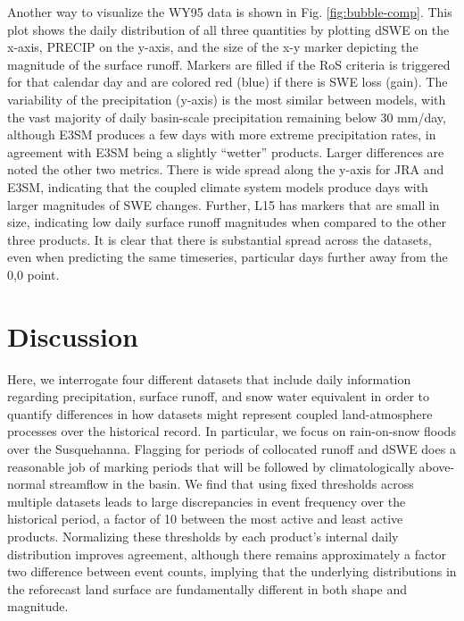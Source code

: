 \documentclass[draft]{agujournal2019}
\begin{document}
Another way to visualize the WY95 data is shown in Fig. \ref{fig:bubble-comp}.  This plot shows the daily distribution of all three quantities by plotting dSWE on the x-axis, PRECIP on the y-axis, and the size of the x-y marker depicting the magnitude of the surface runoff. Markers are filled if the RoS criteria is triggered for that calendar day and are colored red (blue) if there is SWE loss (gain). The variability of the precipitation (y-axis) is the most similar between models, with the vast majority of daily basin-scale precipitation remaining below 30 mm/day, although E3SM produces a few days with more extreme precipitation rates, in agreement with E3SM being a slightly ``wetter'' products. Larger differences are noted the other two metrics. There is wide spread along the y-axis for JRA and E3SM, indicating that the coupled climate system models produce days with larger magnitudes of SWE changes. Further, L15 has markers that are small in size, indicating low daily surface runoff magnitudes when compared to the other three products. It is clear that there is substantial spread across the datasets, even when predicting the same timeseries, particular days further away from the 0,0 point.


\section{Discussion}

Here, we interrogate four different datasets that include daily information regarding precipitation, surface runoff, and snow water equivalent in order to quantify differences in how datasets might represent coupled land-atmosphere processes over the historical record. In particular, we focus on rain-on-snow floods over the Susquehanna. Flagging for periods of collocated runoff and dSWE does a reasonable job of marking periods that will be followed by climatologically above-normal streamflow in the basin. We find that using fixed thresholds across multiple datasets leads to large discrepancies in event frequency over the historical period, a factor of 10 between the most active and least active products. Normalizing these thresholds by each product's internal daily distribution improves agreement, although there remains approximately a factor two difference between event counts, implying that the underlying distributions in the reforecast land surface are fundamentally different in both shape and magnitude.
\end{document}
